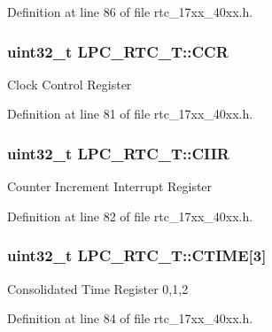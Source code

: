 Definition at line 86 of file rtc\+\_\+17xx\+\_\+40xx.\+h.

\subsubsection[{\texorpdfstring{C\+CR}{CCR}}]{ uint32\+\_\+t L\+P\+C\+\_\+\+R\+T\+C\+\_\+\+T\+::\+C\+CR}\hypertarget{structLPC__RTC__T_ab2117371a628879dbc56f2c1774207b5}{}\label{structLPC__RTC__T_ab2117371a628879dbc56f2c1774207b5}
Clock Control Register 

Definition at line 81 of file rtc\+\_\+17xx\+\_\+40xx.\+h.

\subsubsection[{\texorpdfstring{C\+I\+IR}{CIIR}}]{ uint32\+\_\+t L\+P\+C\+\_\+\+R\+T\+C\+\_\+\+T\+::\+C\+I\+IR}\hypertarget{structLPC__RTC__T_ac9d2627afcf203dccde2675c6c74d673}{}\label{structLPC__RTC__T_ac9d2627afcf203dccde2675c6c74d673}
Counter Increment Interrupt Register 

Definition at line 82 of file rtc\+\_\+17xx\+\_\+40xx.\+h.

\subsubsection[{\texorpdfstring{C\+T\+I\+ME}{CTIME}}]{ uint32\+\_\+t L\+P\+C\+\_\+\+R\+T\+C\+\_\+\+T\+::\+C\+T\+I\+ME\mbox{[}3\mbox{]}}\hypertarget{structLPC__RTC__T_a66b166ccd4abefe149e6e3ef6d833554}{}\label{structLPC__RTC__T_a66b166ccd4abefe149e6e3ef6d833554}
Consolidated Time Register 0,1,2 

Definition at line 84 of file rtc\+\_\+17xx\+\_\+40xx.\+h.

